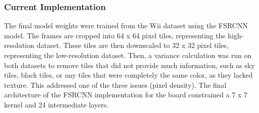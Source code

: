 \documentclass{article}
\begin{document}
        
        \subsubsection{Current Implementation}
            \noindent The final model weights were trained from the Wii dataset using the FSRCNN model. The frames are cropped into 64 x 64 pixel tiles, representing the high-resolution dataset. These tiles are then downscaled to 32 x 32 pixel tiles, representing the low-resolution dataset. Then, a variance calculation was run on both datasets to remove tiles that did not provide much information, such as sky tiles, black tiles, or any tiles that were completely the same color, as they lacked texture. This addressed one of the three issues (pixel density). The final architecture of the FSRCNN implementation for the board constrained a 7 x 7 kernel and 24 intermediate layers.
        
        
\end{document}
